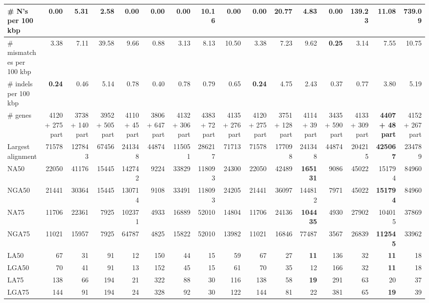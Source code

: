 \documentclass[12pt,a4paper]{article}
\begin{document}
\begin{table}[ht]
\begin{center}
\begin{tabular}{|l*{15}{|r}|}
\# N's per 100 kbp & {\bf 0.00} & 5.31 & 2.58 & {\bf 0.00} & {\bf 0.00} & {\bf 0.00} & 10.16 & {\bf 0.00} & {\bf 0.00} & 20.77 & 4.83 & {\bf 0.00} & 139.23 & 11.08 & 739.09 \\ \hline
\# mismatches per 100 kbp & 3.38 & 7.11 & 39.58 & 9.66 & 0.88 & 3.13 & 8.13 & 10.50 & 3.38 & 7.23 & 9.62 & {\bf 0.25} & 3.14 & 7.55 & 10.75 \\ \hline
\# indels per 100 kbp & {\bf 0.24} & 0.46 & 5.14 & 0.78 & 0.40 & 0.78 & 0.79 & 0.65 & {\bf 0.24} & 4.75 & 2.43 & 0.37 & 0.77 & 3.80 & 5.19 \\ \hline
\# genes & 4120 + 275 part & 3738 + 140 part & 3952 + 505 part & 4110 + 45 part & 3806 + 647 part & 4132 + 306 part & 4383 + 72 part & 4135 + 276 part & 4120 + 275 part & 3751 + 128 part & 4114 + 39 part & 3435 + 590 part & 4133 + 309 part & {\bf 4407 + 48 part} & 4152 + 267 part \\ \hline
Largest alignment & 71578 & 127843 & 67456 & 241348 & 44874 & 115051 & 286217 & 71713 & 71578 & 177098 & 241348 & 44874 & 204215 & {\bf 425067} & 234789 \\ \hline
NA50 & 22050 & 41176 & 15445 & 142742 & 9224 & 33829 & 118093 & 24300 & 22050 & 42489 & {\bf 165131} & 9086 & 45022 & 151794 & 84960 \\ \hline
NGA50 & 21441 & 30364 & 15445 & 130714 & 9108 & 33491 & 118093 & 24205 & 21441 & 36097 & 144812 & 7971 & 45022 & {\bf 151794} & 84960 \\ \hline
NA75 & 11706 & 22361 & 7925 & 102371 & 4933 & 16889 & 52010 & 14804 & 11706 & 24136 & {\bf 104435} & 4930 & 27902 & 104015 & 37869 \\ \hline
NGA75 & 11021 & 15957 & 7925 & 64787 & 4825 & 15822 & 52010 & 13982 & 11021 & 16846 & 77487 & 3567 & 26839 & {\bf 112545} & 33962 \\ \hline
LA50 & 67 & 31 & 91 & 12 & 150 & 44 & 15 & 59 & 67 & 27 & {\bf 11} & 136 & 32 & {\bf 11} & 18 \\ \hline
LGA50 & 70 & 41 & 91 & 13 & 152 & 45 & 15 & 61 & 70 & 35 & 12 & 166 & 32 & {\bf 11} & 18 \\ \hline
LA75 & 138 & 66 & 194 & 21 & 322 & 88 & 30 & 116 & 138 & 58 & {\bf 19} & 291 & 63 & 20 & 37 \\ \hline
LGA75 & 144 & 91 & 194 & 24 & 328 & 92 & 30 & 122 & 144 & 81 & 22 & 381 & 65 & {\bf 19} & 39 \\ \hline
\end{tabular}
\end{center}
\end{table}
\end{document}
